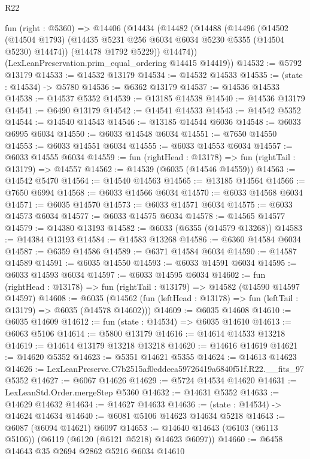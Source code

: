 \begin{lexlean}{R22}
\begin{coremodule}
  fun (right : @5360) =>
  @14406
    (@14434
      (@14482
        (@14488
          (@14496
            (@14502
              (@14504 @1793)
              (@14435 @5231 @256 @6034 @6034 @5230 @5355 (@14504 @5230) @14474))
            (@14478 @1792 @5229))
          @14474))
      (LexLeanPreservation.prim_equal_ordering @14415 @14419))
@14532 := @5792 @13179
@14533 := @14532 @13179
@14534 := @14532 @14533
@14535 := (state : @14534) -> @5780
@14536 := @6362 @13179
@14537 := @14536 @14533
@14538 := @14537 @5352
@14539 := @13185 @14538
@14540 := @14536 @13179
@14541 := @6490 @13179
@14542 := @14541 @14533
@14543 := @14542 @5352
@14544 := @14540 @14543
@14546 := @13185 @14544 @6036
@14548 := @6033 @6995 @6034
@14550 := @6033 @14548 @6034
@14551 := @7650 @14550
@14553 := @6033 @14551 @6034
@14555 := @6033 @14553 @6034
@14557 := @6033 @14555 @6034
@14559 := fun (rightHead : @13178) => fun (rightTail : @13179) => @14557
@14562 := @14539 (@6035 (@14546 @14559))
@14563 := @14542 @5470
@14564 := @14540 @14563
@14565 := @13185 @14564
@14566 := @7650 @6994
@14568 := @6033 @14566 @6034
@14570 := @6033 @14568 @6034
@14571 := @6035 @14570
@14573 := @6033 @14571 @6034
@14575 := @6033 @14573 @6034
@14577 := @6033 @14575 @6034
@14578 := @14565 @14577
@14579 := @14380 @13193
@14582 := @6033 (@6355 (@14579 @13268))
@14583 := @14384 @13193
@14584 := @14583 @13268
@14586 := @6360 @14584 @6034
@14587 := @6359 @14586
@14589 := @6371 @14584 @6034
@14590 := @14587 @14589
@14591 := @6035 @14550
@14593 := @6033 @14591 @6034
@14595 := @6033 @14593 @6034
@14597 := @6033 @14595 @6034
@14602 := fun (rightHead : @13178) => fun (rightTail : @13179) => @14582 (@14590 @14597 @14597)
@14608 := @6035
    (@14562 (fun (leftHead : @13178) => fun (leftTail : @13179) => @6035 (@14578 @14602)))
@14609 := @6035 @14608
@14610 := @6035 @14609
@14612 := fun (state : @14534) => @6035 @14610
@14613 := @6063 @5106
@14614 := @5800 @13179
@14616 := @14614 @14533 @13218
@14619 := @14614 @13179 @13218 @13218
@14620 := @14616 @14619
@14621 := @14620 @5352
@14623 := @5351 @14621 @5355
@14624 := @14613 @14623
@14626 := LexLeanPreserve.C7b2515af0eddeea59726419a6840f51f.R22.__fits_97 @5352
@14627 := @6067 @14626
@14629 := @5724 @14534 @14620
@14631 := LexLeanStd.Order.mergeStep @5360
@14632 := @14631 @5352
@14633 := @14629 @14632
@14634 := @14627 @14633
@14636 := (state : @14534) -> @14624 @14634
@14640 := @6081 @5106 @14623 @14634 @5218
@14643 := @6087 (@6094 @14621) @6097
@14653 := @14640 @14643 (@6103 (@6113 @5106)) (@6119 (@6120 (@6121 @5218) @14623 @6097))
@14660 := @6458 @14643 @35 @2694 @2862 @5216 @6034 @14610

\end{coremodule}
\end{lexlean}
